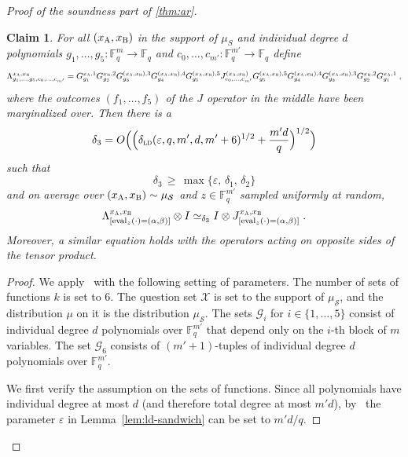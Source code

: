 \documentclass[11pt]{article}
\newtheorem{claim}[theorem]{Claim}
\theoremstyle{definition}
\newcommand{\F}{\ensuremath{\mathbb{F}}}
\newcommand{\ot}{\otimes}
\newcommand{\ld}{\textsc{ld}}
\newcommand{\eps}{\varepsilon}
\newcommand{\sampler}{\mathcal{S}}
\newcommand{\labelstyle}[1]{\ensuremath{\textsc{#1}}\xspace}
\newcommand{\alice}{\labelstyle{A}}
\newcommand{\bob}{\labelstyle{B}}
\newcommand{\eval}{\mathrm{eval}}
\begin{document}
\begin{proof}[Proof of the soundness part of \cref{thm:ar}]
	\begin{claim}\label{claim:ar-5}
    For all $(x_\alice,x_\bob)$ in the support of $\mu_S$ and individual degree $d$
    polynomials $g_1,\ldots,g_5:\F_q^m\to \F_q$ and $c_0,\ldots,c_{m'}:\F_q^{m'}
    \to \F_q$ define
    \begin{equation}
      \Lambda^{{x}_\alice, {x}_\bob}_{ g_1, \dots, g_5, c_0, \dots, c_{m'}} =
      G^{{x}_\alice, 1}_{g_1} G^{{x}_\bob, 2}_{g_2} G^{({x}_\alice, {x}_\bob),
        3}_{g_3} G^{({x}_\alice,{x}_\bob),4}_{g_4} G^{({x}_\alice, {x}_\bob),5}_{g_5} J^{({x}_\alice, {x}_\bob)}_{c_0,
        \dots, c_{m'}} G^{({x}_\alice, {x}_\bob), 5}_{g_5}
      G^{({x}_\alice,{x}_\bob),4}_{g_4}
      G^{({x}_\alice, {x}_\bob), 3}_{g_3} G^{x_\bob,2}_{g_2} G^{{x}_\alice,1}_{g_1}\;,
      \label{eq:lambda-giant-sandwich}
    \end{equation}
    where the outcomes $(f_1,\ldots,f_5)$ of the $J$ operator in the middle have
    been marginalized over.
    Then there is a
    \[\delta_3 = O\Big(\Big(\delta_{\ld}({\eps}, q, m', d,
      m'+6)^{1/2}+ \frac{m'd}{q}\Big)^{1/2}\Big)\]
such that
    \[ \delta_3 \,\geq\, \max\big\{ \eps, \,\delta_1,\,\delta_2\big\}\]
    and on average over $({x}_\alice, {x}_\bob) \sim
    \mu_{\sampler}$ and $z\in \F_q^{m'}$ sampled uniformly at random,
    \begin{equation}
      \Lambda^{{x}_\alice, {x}_\bob}_{[\eval_{z}(\cdot) = ( \alpha, \beta)]} \ot I
      \simeq_{\delta_3} I \ot J^{{x}_\alice, {x}_\bob}_{[\eval_{z}(\cdot)
        = ( \alpha, \beta)]}\;.
    \label{eq:lambda-consistent}
  \end{equation}
	Moreover, a similar equation holds with the operators acting on opposite sides
  of the tensor product.

\end{claim}
	\begin{proof}
    We apply~ with the following setting of parameters.
    The number of sets of functions $k$ is set to $6$.
    The question set $\mathcal{X}$ is set to the support of $\mu_\sampler$, and
    the distribution $\mu$ on it is the distribution $\mu_\sampler$.
    The sets $\mathcal{G}_i$ for $i \in \{1, \dots, 5\}$ consist of individual
    degree $d$ polynomials over $\F_q^{m'}$ that depend only on the $i$-th block
    of $m$ variables.
    The set $\mathcal{G}_6$ consists of $(m' + 1)$-tuples of individual degree
    $d$ polynomials over $\F_q^{m'}$.

    We first verify the assumption on the sets of functions.
    Since all polynomials have individual degree at most $d$ (and therefore
    total degree at most $m'd$), by~ the parameter
    $\eps$ in Lemma~\ref{lem:ld-sandwich} can be set to $m'd/q$.


\end{proof}
\end{proof}
\end{document}

